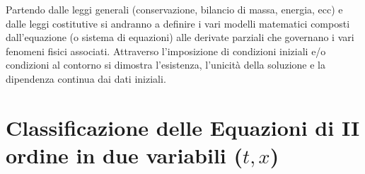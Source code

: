 Partendo dalle leggi generali (conservazione, bilancio di massa, energia, ecc) e dalle leggi costitutive si andranno a definire
i vari modelli matematici composti dall'equazione (o sistema di equazioni) alle derivate parziali che governano i vari fenomeni fisici associati.
Attraverso l'imposizione di condizioni iniziali e/o condizioni al contorno si dimostra l'esistenza, l'unicit\`a della soluzione e la dipendenza continua
dai dati iniziali.
%
\section{Classificazione delle Equazioni di II ordine in due variabili ($t,x$)}
